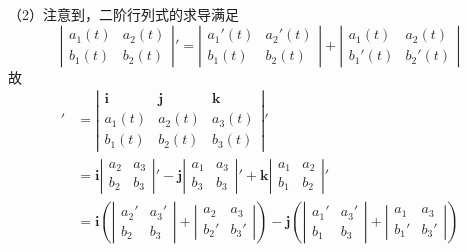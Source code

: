 （2）注意到，二阶行列式的求导满足
$$\left|\begin{array}{cc}
  	a_1(t) & a_2(t) \\
  	b_1(t) & b_2(t)
  \end{array}\right|'
=\left|\begin{array}{cc}
  	a_1'(t) & a_2'(t) \\
  	b_1(t) & b_2(t)
  \end{array}\right|+\left|\begin{array}{cc}
  	a_1(t) & a_2(t) \\
  	b_1'(t) & b_2'(t)
  \end{array}\right|$$
故
\begin{align*}
	[\bm{u}(t)\times\bm{v}(t)]'
	&=\left|\begin{array}{ccc}
	\bm{i} & \bm{j} & \bm{k}\\
  	a_1(t) & a_2(t) & a_3(t)\\
  	b_1(t) & b_2(t) & b_3(t)
  	\end{array}\right|'\\
  	&=\bm{i}\left|\begin{array}{cc}
  	a_2 & a_3\\
  	b_2 & b_3
    \end{array}\right|'
    -\bm{j}\left|\begin{array}{cc}
  	a_1 & a_3\\
  	b_3 & b_3
    \end{array}\right|'
    +\bm{k}\left|\begin{array}{cc}
  	a_1 & a_2\\
  	b_1 & b_2
    \end{array}\right|'\\
    &=\bm{i}\left(\left|\begin{array}{cc}
  	a_2' & a_3'\\
  	b_2 & b_3
    \end{array}\right|
    +\left|\begin{array}{cc}
  	a_2 & a_3\\
  	b_2' & b_3'
    \end{array}\right|\right)
    -\bm{j}\left(\left|\begin{array}{cc}
  	a_1' & a_3'\\
  	b_1 & b_3
    \end{array}\right|
    +\left|\begin{array}{cc}
  	a_1 & a_3\\
  	b_1' & b_3'
    \end{array}\right|\right)\\

\end{align*}
